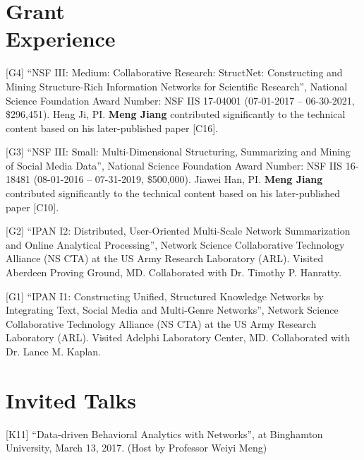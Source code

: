 \documentclass[margin, 9pt]{res}
\begin{document}
\begin{resume}

\section{Grant \\ Experience}

[G4] ``NSF III: Medium: Collaborative Research: StructNet: Constructing and Mining Structure-Rich Information Networks for Scientific Research'', National Science Foundation Award Number: NSF IIS 17-04001 (07-01-2017 -- 06-30-2021, \$296,451). Heng Ji, PI. \textbf{Meng Jiang} contributed significantly to the technical content based on his later-published paper [C16].

[G3] ``NSF III: Small: Multi-Dimensional Structuring, Summarizing and Mining of Social Media Data'', National Science Foundation Award Number: NSF IIS 16-18481 (08-01-2016 -- 07-31-2019, \$500,000). Jiawei Han, PI. \textbf{Meng Jiang} contributed significantly to the technical content based on his later-published paper [C10].

[G2] ``IPAN I2: Distributed, User-Oriented Multi-Scale Network Summarization and Online Analytical Processing'', Network Science Collaborative Technology Alliance (NS CTA) at the US Army Research Laboratory (ARL). Visited Aberdeen Proving Ground, MD. Collaborated with Dr. Timothy P. Hanratty.

[G1] ``IPAN I1: Constructing Unified, Structured Knowledge Networks by Integrating Text, Social Media and Multi-Genre Networks'', Network Science Collaborative Technology Alliance (NS CTA) at the US Army Research Laboratory (ARL). Visited Adelphi Laboratory Center, MD. Collaborated with Dr. Lance M. Kaplan.


\section{Invited Talks}

[K11] ``Data-driven Behavioral Analytics with Networks'', at Binghamton University, March 13, 2017. (Host by Professor Weiyi Meng)


\end{resume}
\end{document}
